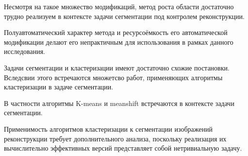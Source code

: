 Несмотря на такое множество модификаций, метод роста области достаточно трудно реализуем в контексте задачи сегментации под контролем реконструкции.

Полуавтоматический характер метода и ресурсоёмкость его автоматической модификации делают его непрактичным для использования в рамках данного исследования.

Задачи сегментации и кластеризации имеют достаточно схожие постановки. Вследсвии этого встречаются множетсво работ, применяющих алгоритмы кластеризации в задаче сегментации.

В частности алгоритмы K-means \cite{sarker2017segmentation} и meanshift \cite{comaniciu2002mean} встречаются в контексте задачи сегментации.

Применимость алгоритмов кластеризации к сегментации изображений реконструкции требует дополнительного анализа, поскольку реализация их вычислительно эффективных версий представляет собой нетривиальную задачу.



